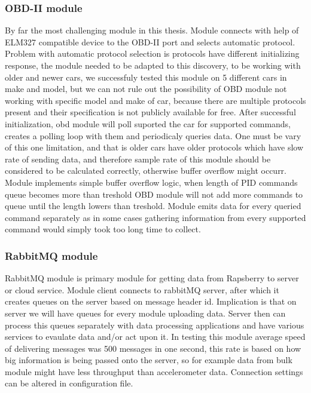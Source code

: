 \subsubsection{OBD-II module} %
By far the most challenging module in this thesis. Module connects with help of ELM327 compatible device to the OBD-II port and selects automatic protocol. Problem with automatic protocol selection is protocols have different initializing response, the module needed to be adapted to this discovery, to be working with older and newer cars, we successfuly tested this module on 5 different cars in make and model, but we can not rule out the possibility of OBD module not working with specific model and make of car, because there are multiple protocols present and their specification is not publicly available for free. After successful initialization, obd module will poll suported the car for supported commands, creates a polling loop with them and periodicaly queries data. One must be vary of this one limitation, and that is older cars have older protocols which have slow rate of sending data, and therefore sample rate of this module should be considered to be calculated correctly, otherwise buffer overflow might occurr. Module implements simple buffer overflow logic, when length of PID commands queue becomes more than treshold OBD module will not add more commands to queue until the length lowers than treshold. Module emits data for every queried command separately as in some cases gathering information from every supported command would simply took too long time to collect.
\label{ssub:obd_ii_module}

\subsubsection{RabbitMQ module} %
\label{ssub:rabbitmq_module}
RabbitMQ module is primary module for getting data from Rapsberry to server or cloud service. Module client connects to rabbitMQ server, after which it creates queues on the server based on message header id. Implication is that on server we will have queues for every module uploading data. Server then can process this queues separately with data processing applications and have various services to evaulate data and/or act upon it. In testing this module average speed of delivering messages was 500 messages in one second, this rate is based on how big information is being passed onto the server, so for example data from bulk module might have less throughput than accelerometer data. Connection settings can be altered in configuration file.

